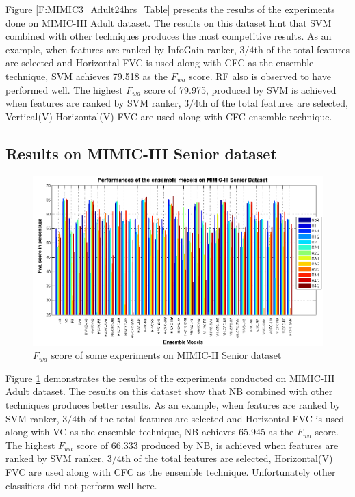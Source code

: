 Figure \ref{F:MIMIC3_Adult24hrs_Table} presents the results of the experiments done on MIMIC-III Adult dataset. The results on this dataset hint that SVM combined with other techniques produces the most competitive results. As an example, when features are ranked by InfoGain ranker, ${3/4}$th of the total features are selected and Horizontal FVC is used along with CFC as the ensemble technique, SVM achieves 79.518 as the $F_{wa}$ score. RF also is observed to have performed well. The highest $F_{wa}$ score of 79.975, produced by SVM is achieved when features are ranked by SVM ranker, ${3/4}$th of the total features are selected, Vertical(V)-Horizontal(V) FVC are used along with CFC ensemble technique. %

\subsection{Results on MIMIC-III Senior dataset}

\begin{figure}[h] 
	\centering 
	\includegraphics[scale=0.6]{fig/mimic3-senior24hrs-full-table.png}
	\caption{$F_{wa}$ score of some experiments on MIMIC-II Senior dataset}
	\label{F:MIMIC3_Senior24hrs_Table}
\end{figure} 

Figure \ref{F:MIMIC3_Senior24hrs_Table} demonstrates the results of the experiments conducted on MIMIC-III Adult dataset. The results on this dataset show that NB combined with other techniques produces better results. As an example, when features are ranked by SVM ranker,  ${3/4}$th of the total features are selected and Horizontal FVC is used along with VC as the ensemble technique, NB achieves 65.945 as the $F_{wa}$ score. The highest $F_{wa}$ score of 66.333 produced by NB, is achieved when features are ranked by SVM ranker, ${3/4}$th of the total features are selected, Horizontal(V) FVC are used along with CFC as the ensemble technique. Unfortunately other classifiers did not perform well here.

